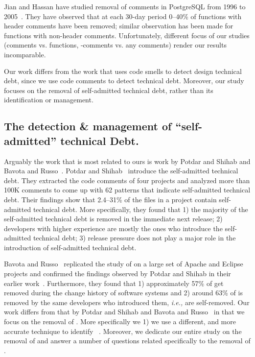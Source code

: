 Jian and Hassan have studied removal of comments in PostgreSQL from 1996 to 2005~\cite{Jiang:Hassan}. They have observed that at each 30-day period 0--40\% of functions with header comments have been removed; similar observation has been made for functions with non-header comments. Unfortunately, different focus of our studies (comments vs. functions, \SATD-comments vs. any comments) render our results incomparable.


Our work differs from the work that uses code smells to detect design technical debt, since we use code comments to detect technical debt. Moreover, our study focuses on the removal of self-admitted technical debt, rather than its identification or management.




\subsection{The detection \& management of ``self-admitted'' technical Debt.} 

Arguably the work that is most related to ours is work by Potdar and Shihab\cite{Potdar2014ICSME} and Bavota and Russo~\cite{Bavota2016MSR}. Potdar and Shihab~\cite{Potdar2014ICSME} introduce the self-admitted technical debt. They extracted the code comments of four projects and analyzed more than 100K comments to come up with 62  patterns that indicate self-admitted technical debt. Their findings show that 2.4--31\% of the files in a project contain self-admitted technical debt. More specifically, they found that 1) the majority of the self-admitted technical debt is removed in the immediate next release; 2) developers with higher experience are mostly the ones who introduce the self-admitted technical debt; 3) release pressure does not play a major role in the introduction of self-admitted technical debt.

Bavota and Russo~\cite{Bavota2016MSR} replicated the study of \SATD on a large set of Apache and Eclipse projects and confirmed the findings observed by Potdar and Shihab in their earlier work~\cite{Potdar2014ICSME}. Furthermore, they found that 1) approximately 57\% of \SATD get removed during the change history of software systems and 2) around 63\% of \SATD is removed by the same developers who introduced them, \emph{i.e.,} are self-removed. Our work differs from that by Potdar and Shihab\cite{Potdar2014ICSME} and Bavota and Russo~\cite{Bavota2016MSR} in that we focus on the removal of \SATD. More specifically we 1) we use a different, and more accurate technique to identify \SATD~\cite{Maldonado2015TSE}. Moreover, we dedicate our entire study on the removal of \SATD and answer a number of questions related specifically to the removal of \SATD.

